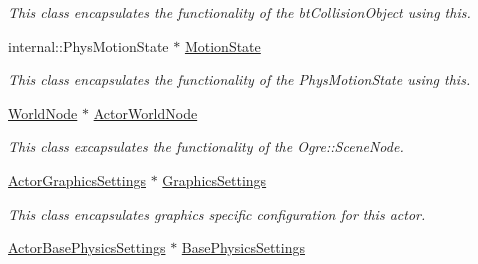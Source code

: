 \begin{DoxyCompactItemize}
\begin{DoxyCompactList}\small\item\em This class encapsulates the functionality of the btCollisionObject using this. \item\end{DoxyCompactList}\item 
\hypertarget{classphys_1_1ActorBase_ab776527aa927b8787313c50530cc24ba}{
internal::PhysMotionState $\ast$ \hyperlink{classphys_1_1ActorBase_ab776527aa927b8787313c50530cc24ba}{MotionState}}
\label{d8/d0f/classphys_1_1ActorBase_ab776527aa927b8787313c50530cc24ba}

\begin{DoxyCompactList}\small\item\em This class encapsulates the functionality of the PhysMotionState using this. \item\end{DoxyCompactList}\item 
\hypertarget{classphys_1_1ActorBase_aca423ad9c3d92bb66a624c95b0de8b85}{
\hyperlink{classphys_1_1WorldNode}{WorldNode} $\ast$ \hyperlink{classphys_1_1ActorBase_aca423ad9c3d92bb66a624c95b0de8b85}{ActorWorldNode}}
\label{d8/d0f/classphys_1_1ActorBase_aca423ad9c3d92bb66a624c95b0de8b85}

\begin{DoxyCompactList}\small\item\em This class excapsulates the functionality of the Ogre::SceneNode. \item\end{DoxyCompactList}\item 
\hypertarget{classphys_1_1ActorBase_acc34ec92179b9ebe392bb0ae98ce5d3a}{
\hyperlink{classphys_1_1ActorGraphicsSettings}{ActorGraphicsSettings} $\ast$ \hyperlink{classphys_1_1ActorBase_acc34ec92179b9ebe392bb0ae98ce5d3a}{GraphicsSettings}}
\label{d8/d0f/classphys_1_1ActorBase_acc34ec92179b9ebe392bb0ae98ce5d3a}

\begin{DoxyCompactList}\small\item\em This class encapsulates graphics specific configuration for this actor. \item\end{DoxyCompactList}\item 
\hypertarget{classphys_1_1ActorBase_a07daafcbc37e64936b2eac7c9582c89f}{
\hyperlink{classphys_1_1ActorBasePhysicsSettings}{ActorBasePhysicsSettings} $\ast$ \hyperlink{classphys_1_1ActorBase_a07daafcbc37e64936b2eac7c9582c89f}{BasePhysicsSettings}}
\label{d8/d0f/classphys_1_1ActorBase_a07daafcbc37e64936b2eac7c9582c89f}


\end{DoxyCompactItemize}
